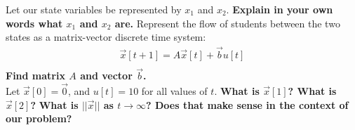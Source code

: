 \begin{enumerate}
    \qitem Let our state variables be represented by $x_1$ and $x_2$. \textbf{Explain in your own words what $x_1$ and $x_2$ are.}
    \qitem Represent the flow of students between the two states as a matrix-vector discrete time system:
    \begin{align*}
        \vec{x}[t+1] =  A\vec{x}[t] + \vec{b}u[t]\\
    \end{align*}
    \textbf{Find matrix $A$ and vector $\vec{b}$.} \\
    \qitem Let $\vec{x}[0] = \vec{0}$, and $u[t] = 10$ for all values of $t$. \textbf{What is $\vec{x}[1]$? What is $\vec{x}[2]$?} \textbf{What is $||\vec{x}||$ as $t\rightarrow\infty$? Does that make sense in the context of our problem?}


\end{enumerate}
